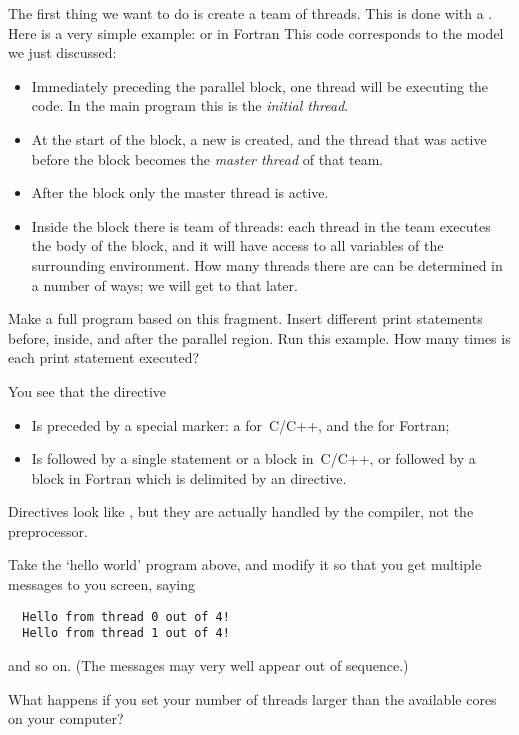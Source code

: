 The first thing we want to do is create a team of threads. This
is done with a .
Here is a very simple example:
or in Fortran
This code corresponds to the model we just discussed:
\begin{itemize}
\item Immediately preceding the parallel block, one thread will be
  executing the code. In the main program this is the \emph{initial
    thread}.
\item At the start of the block, a new  is
  created, and the thread that was active before the block
  becomes the \emph{master thread} of that team.
\item After the block only the master thread is active.
\item Inside the block there is team of threads: each thread in the
  team executes the body of the block, and it will have access to all
  variables of the surrounding environment.
  How many
  threads there are can be determined in a number of ways; we will get to that later.
\end{itemize}

\begin{exercise}
  Make a full program based on this fragment. Insert different print statements
  before, inside, and after the parallel region.
  Run this example. How many times is each print statement executed?
\end{exercise}

You see that the  directive
\begin{itemize}
\item Is preceded by a special marker: a  for~C/C++,
  and the   for Fortran;
\item Is followed by a single statement or a block in~C/C++,
  or followed by a block in Fortran which is delimited by an  directive.
\end{itemize}

Directives look like , but they
are actually handled by the compiler, not the preprocessor.

\begin{exercise}
  Take the `hello world' program above, and modify it so that you get
  multiple messages to you screen, saying
\begin{verbatim}
  Hello from thread 0 out of 4!
  Hello from thread 1 out of 4!
\end{verbatim}
  and so on. (The messages may very well appear out of sequence.)


  What happens if you set your number of threads larger than the available
  cores on your computer?
\end{exercise}

